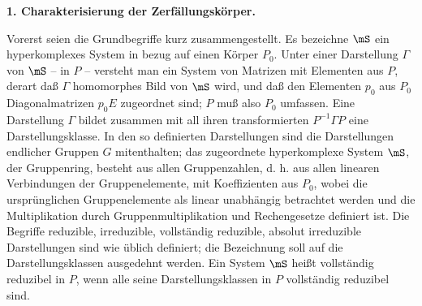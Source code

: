 \begin{center}
\textbf{1. Charakterisierung der Zerfällungskörper.}
\end{center}

Vorerst seien die Grundbegriffe kurz zusammengestellt. Es bezeichne $\mS$ ein hyperkomplexes System in bezug auf einen Körper $P_0$. Unter einer Darstellung $\Gamma$ von $\mS$ -- in $P$ -- versteht man ein System von Matrizen mit Elementen aus $P$, derart daß $\Gamma$ homomorphes Bild von $\mS$ wird, und daß den Elementen $p_0$ aus $P_0$ Diagonalmatrizen $p_0E$ zugeordnet sind; $P$ muß also $P_0$ umfassen. Eine Darstellung $\Gamma$ bildet zusammen mit all ihren transformierten $P^{-1}\Gamma P$ eine Darstellungsklasse. In den so definierten Darstellungen sind die Darstellungen endlicher Gruppen $G$ mitenthalten; das zugeordnete hyperkomplexe System $\mS$, der \guillemotright{}Gruppenring\guillemotleft{}, besteht aus allen \guillemotright{}Gruppenzahlen\guillemotleft{}, d. h. aus allen linearen Verbindungen der Gruppenelemente, mit Koeffizienten aus $P_0$, wobei die ursprünglichen Gruppenelemente als linear unabhängig betrachtet werden und die Multiplikation durch Gruppenmultiplikation und Rechengesetze definiert ist. Die Begriffe \guillemotright{}reduzible\guillemotleft{}, \guillemotright{}irreduzible\guillemotleft{}, \guillemotright{}vollständig reduzible\guillemotleft{}, \guillemotright{}absolut irreduzible\guillemotleft{} Darstellungen sind wie üblich definiert; die Bezeichnung soll auf die Darstellungsklassen ausgedehnt werden. Ein System $\mS$ heißt \guillemotright{}vollständig reduzibel in $P$\guillemotleft{}, wenn alle seine Darstellungsklassen in $P$ vollständig reduzibel sind.
